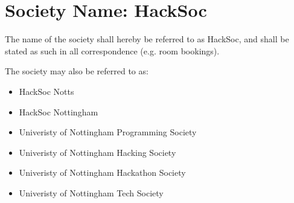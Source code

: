\section*{Society Name: HackSoc}
\begin{clause}
  The name of the society shall hereby be referred to as HackSoc, and shall be stated as such in all correspondence (e.g. room bookings).
\end{clause}

\begin{clause}
  The society may also be referred to as:
  \begin{itemize}
    \item HackSoc Notts
    \item HackSoc Nottingham
    \item Univeristy of Nottingham Programming Society
    \item Univeristy of Nottingham Hacking Society
    \item Univeristy of Nottingham Hackathon Society
    \item Univeristy of Nottingham Tech Society
  \end{itemize}
\end{clause}
  
